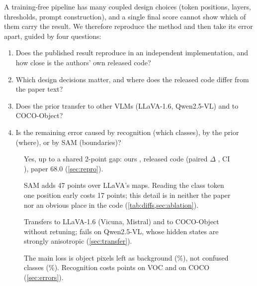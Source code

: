 \documentclass{article}
\newcommand{\finding}[2]{\item[\textcolor{navy}{\textbf{#1}}] #2}
\begin{document}
A training-free pipeline has many coupled design choices (token positions, layers, thresholds, prompt
construction), and a single final score cannot show which of them carry the result. We therefore
reproduce the method and then take its error apart, guided by four questions:
\begin{enumerate}[label=\textbf{\textcolor{navy}{Q\arabic*.}},leftmargin=2.2em]
  \item Does the published result reproduce in an independent implementation, and how close is the
        authors' own released code?
  \item Which design decisions matter, and where does the released code differ from the paper text?
  \item Does the prior transfer to other VLMs (LLaVA-1.6, Qwen2.5-VL) and to COCO-Object?
  \item Is the remaining error caused by recognition (which classes), by the prior (where), or by SAM
        (boundaries)?
\end{enumerate}

\begin{figure}[t]
\begin{findingsbox}
\small
\begin{description}[leftmargin=2.2em,labelwidth=1.8em,itemsep=1pt]
  \finding{Q1}{Yes, up to a shared 2-point gap: ours \miouOurs{}, released code \miouOfficial{}
    (paired $\Delta$ \dOfficial{}, CI \dciOfficial{}), paper 68.0 (\cref{sec:repro}).}
  \finding{Q2}{SAM adds 47 points over LLaVA's maps. Reading the class token one position early
    costs 17 points; this detail is in neither the paper nor an obvious place in the code
    (\cref{tab:diffs,sec:ablation}).}
  \finding{Q3}{Transfers to LLaVA-1.6 (Vicuna, Mistral) and to COCO-Object without retuning;
    fails on Qwen2.5-VL, whose hidden states are strongly anisotropic (\cref{sec:transfer}).}
  \finding{Q4}{The main loss is object pixels left as background (\eBgOurs\%), not confused classes
    (\eWrongOurs\%). Recognition costs \dOracle{} points on VOC and \dCocoOracle{} on COCO
    (\cref{sec:errors}).}
\end{description}
\end{findingsbox}
\vspace{-6pt}
\end{figure}
\end{document}
